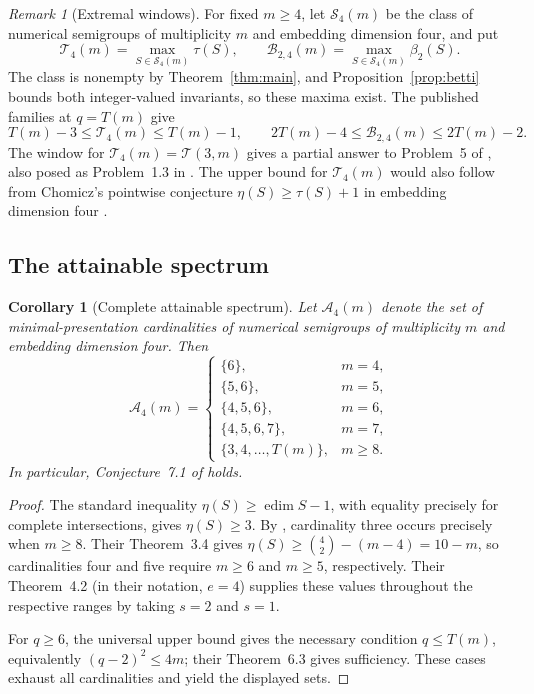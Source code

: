 \documentclass[11pt]{article}
\newtheorem{corollary}[theorem]{Corollary}
\theoremstyle{definition}
\theoremstyle{remark}
\newtheorem{remark}[theorem]{Remark}
\theoremstyle{plain}
\DeclareMathOperator{\edim}{edim}
\begin{document}
\begin{remark}[Extremal windows]\label{rem:extremal-windows}
For fixed \(m\ge4\), let \(\mathcal S_4(m)\) be the class of numerical
semigroups of multiplicity \(m\) and embedding dimension four, and put
\[
\mathcal T_4(m)=\max_{S\in\mathcal S_4(m)}\tau(S),
\qquad
\mathcal B_{2,4}(m)=\max_{S\in\mathcal S_4(m)}\beta_2(S).
\]
The class is nonempty by Theorem~\ref{thm:main}, and
Proposition~\ref{prop:betti} bounds both integer-valued invariants, so
these maxima exist. The published families at \(q=T(m)\) give
\[
T(m)-3\le\mathcal T_4(m)\le T(m)-1,
\qquad
2T(m)-4\le\mathcal B_{2,4}(m)\le2T(m)-2.
\]
The window for $\mathcal T_4(m)=\mathcal T(3,m)$ gives a partial answer
to Problem~5 of \cite{MSSurvey25}, also posed as
Problem~1.3 in \cite{MS25}. The upper bound for $\mathcal T_4(m)$
would also follow from Chomicz's pointwise conjecture
$\eta(S)\ge\tau(S)+1$ in embedding dimension four
\cite[Conjecture~5.1]{Chomicz26B}.
\end{remark}

\subsection{The attainable spectrum}
\medskip
\begin{corollary}[Complete attainable spectrum]\label{cor:spectrum}
Let \(\mathcal A_4(m)\) denote the set of minimal-presentation cardinalities
of numerical semigroups of multiplicity \(m\) and embedding dimension four.
Then
\[
\mathcal A_4(m)=
\begin{cases}
\{6\},&m=4,\\
\{5,6\},&m=5,\\
\{4,5,6\},&m=6,\\
\{4,5,6,7\},&m=7,\\
\{3,4,\ldots,T(m)\},&m\ge8.
\end{cases}
\]
In particular, Conjecture~7.1 of \cite{EHOOPK24} holds.\end{corollary}

\begin{proof}
The standard inequality \(\eta(S)\ge\edim S-1\), with equality precisely
for complete intersections, gives \(\eta(S)\ge3\). By
\cite[Propositions~6.2 and~7.6]{EHOOPK24}, cardinality three occurs
precisely when \(m\ge8\). Their Theorem~3.4 gives
\(\eta(S)\ge\binom42-(m-4)=10-m\), so cardinalities four and five
require \(m\ge6\) and \(m\ge5\), respectively. Their Theorem~4.2
(in their notation, \(e=4\)) supplies these values throughout the
respective ranges by taking \(s=2\) and \(s=1\).

For \(q\ge6\), the universal upper bound gives the necessary condition
\(q\le T(m)\), equivalently \((q-2)^2\le4m\); their Theorem~6.3
gives sufficiency. These cases exhaust all cardinalities and yield the
displayed sets.
\end{proof}
\end{document}
